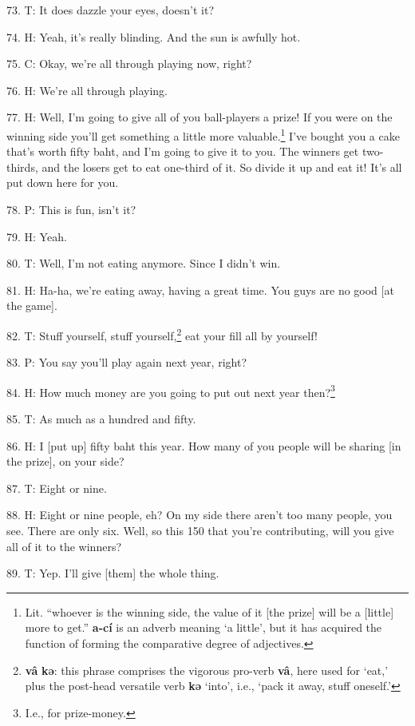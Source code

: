 73. T:  It does
dazzle your eyes, doesn't it?

74. H: Yeah, it's really blinding. And the sun is awfully hot.

75. C: Okay, we're all through playing now, right?

76. H: We're all through playing.


77. H: Well, I'm going to give all of you ball-players a prize! If you were on the
winning side you'll get something a little more valuable.\footnote{Lit. ``whoever is the winning side, the value of it [the prize] will be a [little] more to get.'' \textbf{a-cí} is an adverb meaning `a little', but it has acquired the function of forming the comparative degree of adjectives.} I've bought you a
cake that's worth fifty baht, and I'm going to give it to you. The winners get
two-thirds, and the losers get to eat one-third of it. So divide it up and eat
it! It's all put down here for you.

78. P: This is fun, isn't it?

79. H: Yeah.

80. T: Well, I'm not eating anymore. Since I didn't win.

81. H: Ha-ha, we're eating away, having a great time. You guys are no good [at the
game].

82. T: Stuff yourself, stuff yourself,\footnote{\textbf{vâ} \textbf{kə}: this phrase comprises the vigorous pro-verb \textbf{vâ}, here used for `eat,' plus the post-head versatile verb \textbf{kə} `into', i.e., `pack it away, stuff oneself.'} eat your fill all by yourself!

83. P: You say you'll play again next year, right?

84. H: How much money are you going to put out next year then?\footnote{I.e., for prize-money.}

85. T: As much as a hundred and fifty.

86. H: I [put up] fifty baht this year. How many of you people will be sharing [in
the prize], on your side?

87. T: Eight or nine.

88. H: Eight or nine people, eh? On my side there aren't too many people, you see.
There are only six. Well, so this 150 that you're contributing, will you give all
of it to the winners?

89. T: Yep. I'll give [them] the whole thing.

